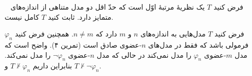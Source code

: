 ~
فرض کنید $T$ یک نظریهٔ مرتبهٔ اوّل است که حدّ اقل دو مدل متناهی از اندازه‌های متمایز دارد. ثابت کنید $T$ کامل نیست.
\begin{ans}
    فرض کنید $T$ مدل‌هایی به اندازه‌های $n$ و $m$ دارد که $n\neq m$.
    همچنین فرض کنید
    $\varphi_n$
    فرمولی باشد که فقط در مدل‌های $n$-عضوی صادق است (تمرین ۴). واضح است که مدل $m$-عضوی $\varphi_n$ را مدل نمی‌کند در حالی که مدل $n$-عضوی $\neg\varphi_n$ را مدل نمی‌کند. بنابراین داریم
    $T\not\vdash \varphi_n$
    و
    $T\not\vdash \neg\varphi_n$.
\end{ans}